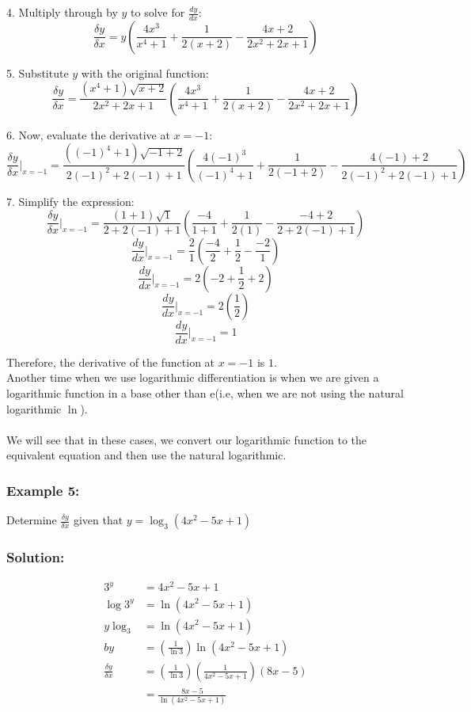 \documentclass{article}
\begin{document}
4. Multiply through by $y$ to solve for $\frac{dy}{dx}$:
   $$\frac{\delta y}{\delta x} = y\left(\frac{4x^3}{x^4+1} + \frac{1}{2(x+2)} - \frac{4x+2}{2x^2+2x+1}\right)$$

5. Substitute $y$ with the original function:
   $$\frac{\delta y}{\delta x} = \frac{(x^4+1)\sqrt{x+2}}{2x^2+2x+1}\left(\frac{4x^3}{x^4+1} + \frac{1}{2(x+2)} - \frac{4x+2}{2x^2+2x+1}\right)$$

6. Now, evaluate the derivative at $x=-1$:
   $$\frac{\delta y}{\delta x}\bigg|_{x=-1} = \frac{((-1)^4+1)\sqrt{-1+2}}{2(-1)^2+2(-1)+1}\left(\frac{4(-1)^3}{(-1)^4+1} + \frac{1}{2(-1+2)} - \frac{4(-1)+2}{2(-1)^2+2(-1)+1}\right)$$

7. Simplify the expression:
   $$\frac{\delta y}{\delta x}\bigg|_{x=-1} = \frac{(1+1)\sqrt{1}}{2+2(-1)+1}\left(\frac{-4}{1+1} + \frac{1}{2(1)} - \frac{-4+2}{2+2(-1)+1}\right)$$
   $$\frac{dy}{dx}\bigg|_{x=-1} = \frac{2}{1}\left(\frac{-4}{2} + \frac{1}{2} - \frac{-2}{1}\right)$$
   $$\frac{dy}{dx}\bigg|_{x=-1} = 2\left(-2 + \frac{1}{2} + 2\right)$$
   $$\frac{dy}{dx}\bigg|_{x=-1} = 2\left(\frac{1}{2}\right)$$
   $$\frac{dy}{dx}\bigg|_{x=-1} = 1$$

Therefore, the derivative of the function at $x=-1$ is $1$.\\
Another time when we use logarithmic differentiation is when we are given a logarithmic function in a base other than e(i.e, when we are not using the natural logarithmic $\ln$).\\\\
We will see that in these cases, we convert our logarithmic function to the equivalent equation and then use the natural logarithmic.
\subsubsection*{Example 5: }
Determine $\frac{\delta y}{\delta x}$ given that $y=\log_3(4x^2-5x+1)$
\subsubsection*{Solution: }
\begin{align*}
    3^y&=4x^2-5x+1\\
    \log 3^y&=\ln(4x^2-5x+1)\\
    y\log_3&=\ln(4x^2-5x+1)\\b
    y&=\left(\frac{1}{\ln 3}\right)\ln(4x^2-5x+1)\\
    \frac{\delta y}{\delta x}&=\left(\frac{1}{\ln 3}\right)\left(\frac{1}{4x^2-5x+1}\right)(8x-5)\\
    &=\frac{8x-5}{\ln(4x^2-5x+1)}
\end{align*}
\end{document}
